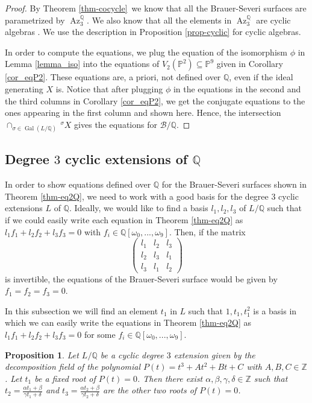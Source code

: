 \documentclass[a4paper,10pt]{amsart}
\theoremstyle{plain}
\newtheorem{proposition}[theorem]{Proposition}
\theoremstyle{definition}
\theoremstyle{remark}
\numberwithin{equation}{section}
\begin{document}
\begin{proof} By Theorem \ref{thm-cocycle}~we know that all the Brauer-Severi surfaces are parametrized by $\operatorname{Az}_3^{\mathbb{Q}}$. We also know that all the elements in $\operatorname{Az}_3^{\mathbb{Q}}$ are cyclic algebras \cite{Wed}. We use the description in Proposition \ref{prop-cyclic} for cyclic algebras. 
	
	In order to compute the equations, we plug the equation of the isomorphism $\phi$ in Lemma \ref{lemma_iso} into the equations of $V_2(\mathbb{P}^2)\subseteq\mathbb{P}^9$ given in Corollary \ref{cor_eqP2}. These equations are, a priori, not defined over $\mathbb{Q}$, even if the ideal generating $X$ is. Notice that after plugging $\phi$ in the equations in the second and the third columns in Corollary \ref{cor_eqP2}, we get the conjugate equations to the ones appearing in the first column and shown here. Hence, the intersection $\cap_{\sigma\in\operatorname{Gal}(L/{\mathbb{Q}})}\,^{\sigma}X$ gives the equations for $\mathcal{B}/{\mathbb{Q}}$.
\end{proof}

\subsection{Degree $3$ cyclic extensions of ${\mathbb{Q}}$}

In order to show equations defined over ${\mathbb{Q}}$ for the Brauer-Severi surfaces shown in Theorem \ref{thm-eq2Q}, we need to work with a good basis for the degree $3$ cyclic extensions $L$ of ${\mathbb{Q}}$. Ideally, we would like to find a basis $l_1, l_2,l_3$ of $L/{\mathbb{Q}}$ such that if we could easily write each equation in Theorem \ref{thm-eq2Q} as $l_1f_1+l_2f_2+l_3f_3=0$ with $f_i\in{\mathbb{Q}}[\omega_0,...,\omega_9]$. Then, if the matrix
\small{
$$
\begin{pmatrix}
l_1 & l_2 & l_3\\ l_2 & l_3 & l_1 \\ l_3 & l_1 & l_2
\end{pmatrix}
$$}
is invertible, the equations of the Brauer-Severi surface would be given by $f_1=f_2=f_3=0$. 

In this subsection we will find an element $t_1$ in $L$ such that $1,t_1,t_1^2$ is a basis in which we can easily write the equations in Theorem \ref{thm-eq2Q} as $l_1f_1+l_2f_2+l_3f_3=0$ for some $f_i\in{\mathbb{Q}}[\omega_0,...,\omega_9]$.

\begin{proposition}\label{prop-ext3} Let $L/\mathbb{Q}$ be a cyclic degree $3$ extension given by the decomposition field of the polynomial $P(t)=t^3+At^2+Bt+C$ with $A,B,C\in\mathbb{Z}$. Let $t_1$ be a fixed root of $P(t)=0$. Then there exist $\alpha,\beta,\gamma,\delta\in\mathbb{Z}$ such that $t_2=\frac{\alpha t_1+\beta}{\gamma t_1+\delta}$ and $t_3=\frac{\alpha t_2+\beta}{\gamma t_2+\delta}$ are the other two roots of $P(t)=0$.
\end{proposition}
\end{document}
